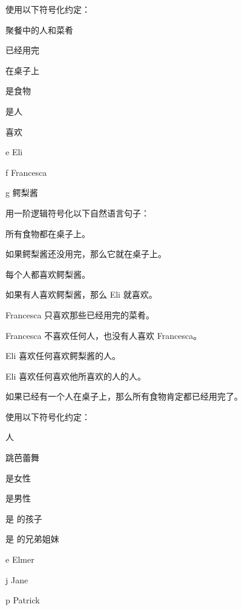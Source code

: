 \problempart
使用以下符号化约定：


\begin{ekey}
\item[\text{论域}] 聚餐中的人和菜肴
\item[\atom{R}{x}]  已经用完
\item[\atom{T}{x}]  在桌子上
\item[\atom{F}{x}]  是食物
\item[\atom{P}{x}]  是人
\item[\atom{L}{x,y}]  喜欢 
\item[e] Eli
\item[f] Francesca
\item[g] 鳄梨酱
\end{ekey}


用一阶逻辑符号化以下自然语言句子：


\begin{compactlist}
\item 所有食物都在桌子上。
\item 如果鳄梨酱还没用完，那么它就在桌子上。
\item 每个人都喜欢鳄梨酱。
\item 如果有人喜欢鳄梨酱，那么 Eli 就喜欢。
\item Francesca 只喜欢那些已经用完的菜肴。
\item Francesca 不喜欢任何人，也没有人喜欢 Francesca。
\item Eli 喜欢任何喜欢鳄梨酱的人。
\item Eli 喜欢任何喜欢他所喜欢的人的人。
\item 如果已经有一个人在桌子上，那么所有食物肯定都已经用完了。
\end{compactlist}

\solutions
\problempart
\label{pr.FOLballet}
使用以下符号化约定：


\begin{ekey}
\item[\text{论域}] 人
\item[\atom{D}{x}]  跳芭蕾舞
\item[\atom{F}{x}]  是女性
\item[\atom{M}{x}]  是男性
\item[\atom{C}{x,y}]  是  的孩子
\item[\atom{S}{x,y}]  是  的兄弟姐妹
\item[e] Elmer
\item[j] Jane
\item[p] Patrick
\end{ekey}



